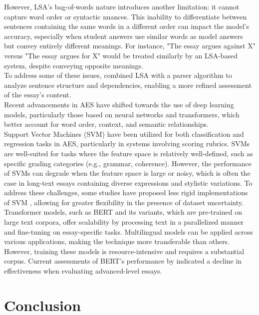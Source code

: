 \documentclass{article}
\begin{document}
	However, LSA’s bag-of-words nature introduces another limitation: it cannot capture word order or syntactic nuances. This inability to differentiate between sentences containing the same words in a different order can impact the model's accuracy, especially when student answers use similar words as model answers but convey entirely different meanings. For instance, "The essay argues against X" versus "The essay argues for X" would be treated similarly by an LSA-based system, despite conveying opposite meanings. \\
	
	To address some of these issues, \textcite{26_alsanie2022threelevels} combined LSA with a parser algorithm to analyze sentence structure and dependencies, enabling a more refined assessment of the essay’s content. \\
	
	Recent advancements in AES have shifted towards the use of deep learning models, particularly those based on neural networks and transformers, which better account for word order, context, and semantic relationships. \\
	
	Support Vector Machines (SVM) have been utilized for both classification and regression tasks in AES, particularly in systems involving scoring rubrics. SVMs are well-suited for tasks where the feature space is relatively well-defined, such as specific grading categories (e.g., grammar, coherence). However, the performance of SVMs can degrade when the feature space is large or noisy, which is often the case in long-text essays containing diverse expressions and stylistic variations. To address these challenges, some studies have proposed less rigid implementations of SVM \cite{17_abbas2015svm}, allowing for greater flexibility in the presence of dataset uncertainty. \\
	
	Transformer models, such as BERT and its variants, which are pre-trained on large text corpora, offer scalability by processing text in a parallelized manner and fine-tuning on essay-specific tasks. Multilingual models can be applied across various applications, making the technique more transferable than others. However, training these models is resource-intensive and requires a substantial corpus. Current assessments of BERT's performance by \textcite{9_firoozi2024bert} indicated a decline in effectiveness when evaluating advanced-level essays. 
	
	\section{Conclusion}
	
\end{document}
